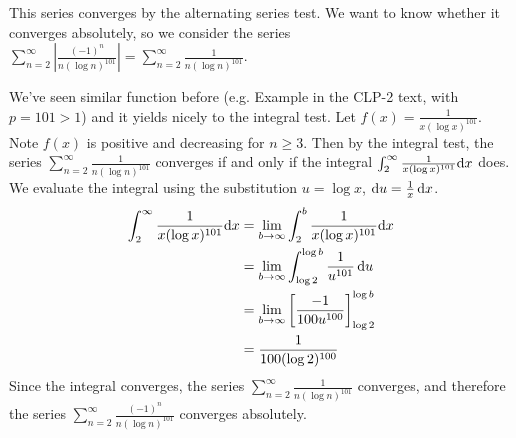 \begin{solution}
This series converges by the alternating series test. We want to know whether it converges absolutely, so we consider the series$\displaystyle\sum_{n=2}^\infty\left|\frac{(-1)^n}{n(\log n)^{101}}\right|=\sum_{n=2}^\infty\frac{1}{n(\log n)^{101}}$.

We've seen similar function before (e.g. Example  in the CLP-2 text, with $p=101>1$) and it yields nicely to the integral test. Let $f(x) = \frac{1}{x(\log x)^{101}}$. Note $f(x)$ is positive and decreasing for $n \ge 3$. Then by the integral test, the series
$\sum_{n=2}^\infty\frac{1}{n(\log n)^{101}}$ converges if and only if the integral
$\int_2^\infty \frac{1}{x(\log x)^{101}}\mathrm{d}x$ does. We evaluate the integral using the substitution $u=\log x$, $\mathrm{d}u=\frac{1}{x}\,\mathrm{d}x$.
\begin{align*}
\int_2^\infty \frac{1}{x(\log x)^{101}}\mathrm{d}x&=\lim_{b \to \infty}\int_2^b \frac{1}{x(\log x)^{101}}\mathrm{d}x\\
&=\lim_{b \to \infty}\int_{\log 2}^{\log b}\frac{1}{u^{101}}\,\mathrm{d}u\\
&=\lim_{b \to \infty}\left[\frac{-1}{100 u^{100}}\right]_{\log 2}^{\log b}\\
&=\frac{1}{100(\log 2)^{100}}
\end{align*}
Since the integral converges, the series
$\sum\limits_{n=2}^\infty\frac{1}{n(\log n)^{101}}$ converges, and therefore the series
$\sum\limits_{n=2}^\infty\frac{(-1)^n}{n(\log n)^{101}}$ converges absolutely.
\end{solution}

